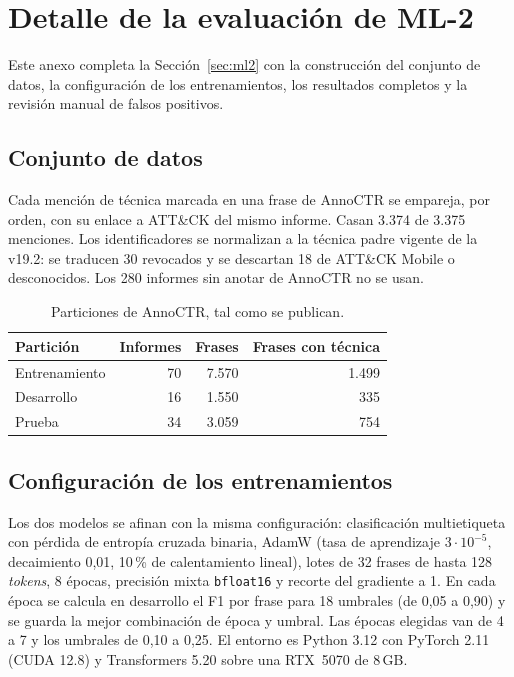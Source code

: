 \chapter{Detalle de la evaluación de ML-2}
\label{anx:ml2}

Este anexo completa la Sección~\ref{sec:ml2} con la construcción del conjunto de datos, la
configuración de los entrenamientos, los resultados completos y la revisión manual de falsos
positivos.

\section{Conjunto de datos}

Cada mención de técnica marcada en una frase de AnnoCTR se empareja, por orden, con su enlace a
ATT\&CK del mismo informe. Casan 3.374 de 3.375 menciones. Los identificadores se normalizan a la
técnica padre vigente de la v19.2: se traducen 30 revocados y se descartan 18 de ATT\&CK Mobile o
desconocidos. Los 280 informes sin anotar de AnnoCTR no se usan.

\begin{table}[H]
\centering
\begin{tabular}{|l|r|r|r|}
\hline
\textbf{Partición} & \textbf{Informes} & \textbf{Frases} & \textbf{Frases con técnica} \\
\hline
Entrenamiento & 70 & 7.570 & 1.499 \\
Desarrollo & 16 & 1.550 & 335 \\
Prueba & 34 & 3.059 & 754 \\
\hline
\end{tabular}
\caption{Particiones de AnnoCTR, tal como se publican.}
\end{table}

\section{Configuración de los entrenamientos}

Los dos modelos se afinan con la misma configuración: clasificación multietiqueta con pérdida de
entropía cruzada binaria, AdamW (tasa de aprendizaje $3\cdot10^{-5}$, decaimiento 0,01, 10\,\% de
calentamiento lineal), lotes de 32 frases de hasta 128 \textit{tokens}, 8 épocas, precisión mixta
\texttt{bfloat16} y recorte del gradiente a 1. En cada época se calcula en desarrollo el F1 por
frase para 18 umbrales (de 0,05 a 0,90) y se guarda la mejor combinación de época y umbral. Las
épocas elegidas van de 4 a 7 y los umbrales de 0,10 a 0,25. El entorno es Python 3.12 con PyTorch
2.11 (CUDA 12.8) y Transformers 5.20 sobre una RTX~5070 de 8\,GB.

